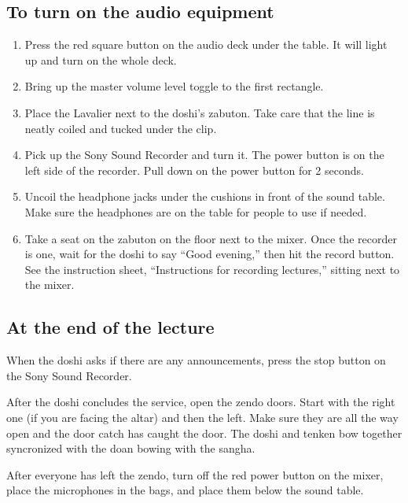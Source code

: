 \documentclass{chantbook}
\begin{document}
\subsection*{To turn on the audio equipment}
\begin{enumerate}
\item Press the red square button on the audio deck under the table. It will
light up and turn on the whole deck.
\item Bring up the master volume level toggle to the first rectangle.
\item Place the Lavalier next to the doshi's zabuton. Take care that the line
is neatly coiled and tucked under the clip.
\item Pick up the Sony Sound Recorder and turn it. The power button is on the
left side of the recorder. Pull down on the power button for 2 seconds.
\item Uncoil the headphone jacks under the cushions in front of the sound
table. Make sure the headphones are on the table for people to use if needed.
\item Take a seat on the zabuton on the floor next to the mixer. Once the
recorder is one, wait for the doshi to say ``Good evening,'' then hit the
record button. See the instruction sheet, ``Instructions for recording
lectures,'' sitting next to the mixer.
\end{enumerate}

\subsection*{At the end of the lecture}
When the doshi asks if there are any announcements, press the stop button on the
Sony Sound Recorder.

After the doshi concludes the service, open the zendo doors. Start with the
right one (if you are facing the altar) and then the left. Make sure they are
all the way open and the door catch has caught the door. The doshi and tenken
bow together syncronized with the doan bowing with the sangha.

After everyone has left the zendo, turn off the red power button on the mixer,
place the microphones in the bags, and place them below the sound table.
\end{document}
